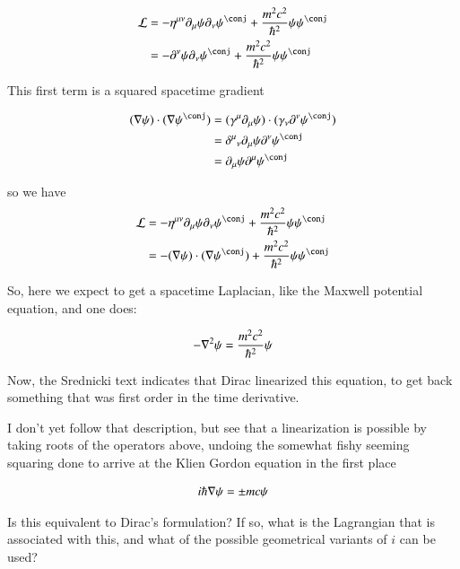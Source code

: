 \documentclass{article}
\begin{document}
\begin{align*}
\LL &= -\eta^{\mu\nu} \partial_\mu \psi \partial_\nu \psi^\conj + \frac{m^2 c^2}{\hbar^2} \psi \psi^\conj \\
&= -\partial^\nu \psi \partial_\nu \psi^\conj + \frac{m^2 c^2}{\hbar^2} \psi \psi^\conj \\
\end{align*}

This first term is a squared spacetime gradient

\begin{align*}
(\grad \psi) \cdot (\grad \psi^\conj) 
&= (\gamma^\mu \partial_\mu \psi) \cdot (\gamma_\nu \partial^\nu \psi^\conj) \\
&= {\delta^\mu}_\nu \partial_\mu \psi \partial^\nu \psi^\conj \\
&= \partial_\mu \psi \partial^\mu \psi^\conj \\
\end{align*}

so we have
\begin{align*}
\LL 
&= -\eta^{\mu\nu} \partial_\mu \psi \partial_\nu \psi^\conj + \frac{m^2 c^2}{\hbar^2} \psi \psi^\conj \\
&= -(\grad \psi) \cdot (\grad \psi^\conj) + \frac{m^2 c^2}{\hbar^2} \psi \psi^\conj \\
\end{align*}

So, here we expect to get a spacetime Laplacian, like the Maxwell potential equation, and one does:

\begin{align*}
-\nabla^2 \psi = \frac{m^2 c^2}{\hbar^2} \psi
\end{align*}

Now, the Srednicki text indicates that Dirac linearized this equation, to get back something that was
first order in the time derivative.

I don't yet follow that description, but see that a linearization is possible by taking roots of the operators above,
undoing the somewhat fishy seeming squaring done to arrive at the Klien Gordon equation in the first place

\begin{align*}
i \hbar \nabla \psi = \pm m c \psi
\end{align*}

Is this equivalent to Dirac's formulation?  If so, what is the Lagrangian that is associated with this, and what of the possible geometrical variants of $i$ can be used?
\end{document}

